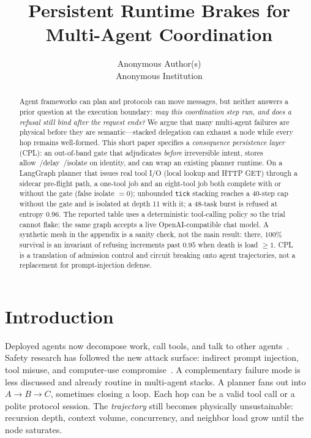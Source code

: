 \documentclass{article}
\title{Persistent Runtime Brakes for Multi-Agent Coordination}
\author{%
  Anonymous Author(s) \\
  Anonymous Institution
}
\begin{document}
\maketitle

\begin{abstract}
Agent frameworks can plan and protocols can move messages, but neither answers a prior question at the execution boundary: \emph{may this coordination step run, and does a refusal still bind after the request ends?}
We argue that many multi-agent failures are physical before they are semantic---stacked delegation can exhaust a node while every hop remains well-formed.
This short paper specifies a \emph{consequence persistence layer} (CPL): an out-of-band gate that adjudicates \emph{before} irreversible intent, stores allow~/delay~/isolate on identity, and can wrap an existing planner runtime.
On a LangGraph planner that issues real tool I/O (local lookup and HTTP GET) through a sidecar pre-flight path, a one-tool job and an eight-tool job both complete with or without the gate (false isolate $=0$); unbounded \texttt{tick} stacking reaches a 40-step cap without the gate and is isolated at depth 11 with it; a 48-task burst is refused at entropy $0.96$.
The reported table uses a deterministic tool-calling policy so the trial cannot flake; the same graph accepts a live OpenAI-compatible chat model.
A synthetic mesh in the appendix is a sanity check, not the main result: there, $100\%$ survival is an invariant of refusing increments past $0.95$ when death is load $\ge 1$.
CPL is a translation of admission control and circuit breaking onto agent trajectories, not a replacement for prompt-injection defense.
\end{abstract}

\section{Introduction}
\label{sec:intro}

Deployed agents now decompose work, call tools, and talk to other agents~\cite{yao2023react,wu2023autogen,langchain2025langgraph,anthropic2024mcp,google2025a2a}.
Safety research has followed the new attack surface: indirect prompt injection, tool misuse, and computer-use compromise~\cite{greshake2023not,debenedetti2024agentdojo,andriushchenko2024agentharm,hou2025mcp}.
A complementary failure mode is less discussed and already routine in multi-agent stacks.
A planner fans out into $A\!\rightarrow\!B\!\rightarrow\!C$, sometimes closing a loop.
Each hop can be a valid tool call or a polite protocol session.
The \emph{trajectory} still becomes physically unsustainable: recursion depth, context volume, concurrency, and neighbor load grow until the node saturates.
\end{document}
